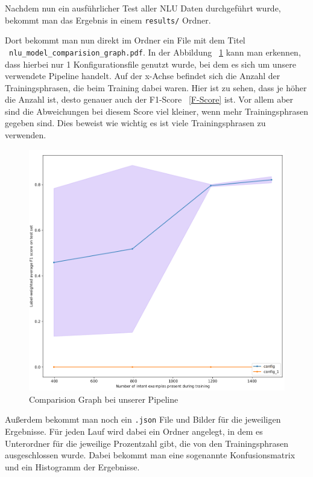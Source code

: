 Nachdem nun ein ausführlicher Test aller NLU Daten durchgeführt wurde, bekommt man das Ergebnis in einem \texttt{results/} Ordner.\cite{interpretingTheOutput}

Dort bekommt man nun direkt im Ordner ein File mit dem Titel ~\texttt{nlu\_model\_comparision\_graph.pdf}.
In der Abbildung ~\ref{fig:comparision_graph} kann man erkennen, dass hierbei nur 1 Konfigurationsfile genutzt wurde, bei dem es sich um unsere verwendete Pipeline handelt.
Auf der x-Achse befindet sich die Anzahl der Trainingsphrasen, die beim Training dabei waren.
Hier ist zu sehen, dass je höher die Anzahl ist, desto genauer auch der F1-Score ~\ref{F-Score} ist.
Vor allem aber sind die Abweichungen bei diesem Score viel kleiner, wenn mehr Trainingsphrasen gegeben sind.
Dies beweist wie wichtig es ist viele Trainingsphrasen zu verwenden.

\begin{figure}[hbt!]
    \centering
    \includegraphics[scale=0.4]{pics/comparision_graph}
    \caption{Comparision Graph bei unserer Pipeline}
    \label{fig:comparision_graph}
\end{figure}

Außerdem bekommt man noch ein \texttt{.json} File und Bilder für die jeweiligen Ergebnisse.
Für jeden Lauf wird dabei ein Ordner angelegt, in dem es Unterordner für die jeweilige Prozentzahl gibt, die von den Trainingsphrasen ausgeschlossen wurde.
Dabei bekommt man eine sogenannte Konfusionsmatrix und ein Histogramm der Ergebnisse.

